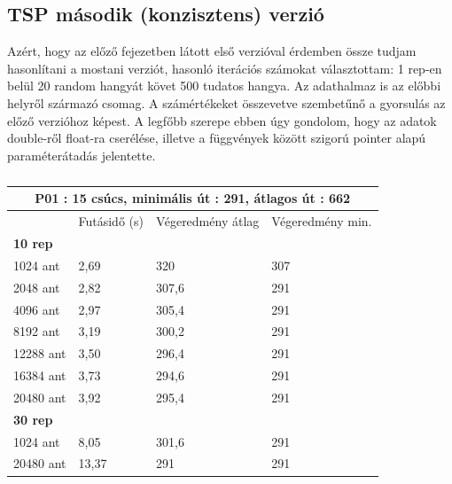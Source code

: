 \subsection{TSP második (konzisztens) verzió}
Azért, hogy az előző fejezetben látott első verzióval érdemben össze tudjam hasonlítani a mostani verziót, hasonló iterációs számokat választottam: 1 rep-en belül 20 random hangyát követ 500 tudatos hangya. Az adathalmaz is az előbbi \cite{TSPdataset} helyről származó csomag. A számértékeket összevetve szembetűnő a gyorsulás az előző verzióhoz képest. A legfőbb szerepe ebben úgy gondolom, hogy az adatok double-ről float-ra cserélése, illetve a függvények között szigorú pointer alapú paraméterátadás jelentette.

\begin{table}[ht!]
	\centering
	\begin{tabular}{|p{2cm}||p{3cm}|p{3.5cm}|p{3.5cm}|}
		\hline
		\multicolumn{4}{|c|}{P01 : 15 csúcs, minimális út : 291, átlagos út : 662} \\
		\hline
		& Futásidő (s) & Végeredmény átlag & Végeredmény min.\\
		\hline
		\textbf{10 rep} & & &\\
		1024 ant & 2,69 & 320  & 307\\
		2048 ant & 2,82 & 307,6 & 291\\
		4096 ant & 2,97 & 305,4 & 291\\
		8192 ant & 3,19 & 300,2 & 291\\
		12288 ant & 3,50 & 296,4 & 291\\
		16384 ant & 3,73 & 294,6 & 291\\
		20480 ant & 3,92 & 295,4 & 291\\
		\hline
		\textbf{30 rep} & & &\\
		1024 ant & 8,05 & 301,6 & 291\\
		20480 ant & 13,37 & 291 & 291\\
		\hline
	\end{tabular}
	\caption{}
	\label{table:TSPv2_15}
\end{table}

